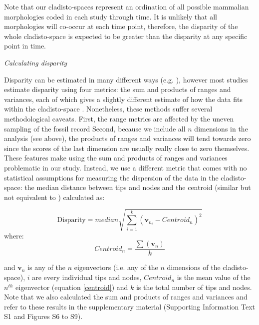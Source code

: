 \documentclass[12pt,letterpaper]{article}
\renewcommand{\subsection}[1]{%
\bigskip
\begin{center}
\begin{large}
\normalfont\itshape #1
\end{large}
\end{center}}
\begin{document}
Note that our cladisto-spaces represent an ordination of all possible mammalian morphologies coded in each study through time.
It is unlikely that all morphologies will co-occur at each time point, therefore, the disparity of the whole cladisto-space is expected to be greater than the disparity at any specific point in time.

\subsection{Calculating disparity}
Disparity can be estimated in many different ways (e.g. \cite{Wills1994,Ciampaglio2001}), however most studies estimate disparity using four metrics: the sum and products of ranges and variances, each of which gives a slightly different estimate of how the data fits within the cladisto-space \cite{Wills1994,brusatte50,Brusatte12092008,toljagictriassic-jurassic2013,ruta2013,bensonfaunal2014}.
Nonetheless, these methods suffer several methodological caveats.
First, the range metrics are affected by the uneven sampling of the fossil record \cite{Butler2012}
Second, because we include all $n$ dimensions in the analysis (see above), the products of ranges and variances will tend towards zero since the scores of the last dimension are usually really close to zero themselves. 
These features make using the sum and products of ranges and variances problematic in our study.
Instead, we use a different metric that comes with no statistical assumptions for measuring the dispersion of the data in the cladisto-space: the median distance between tips and nodes and the centroid (similar but not equivalent to \cite{Wills1994,kornextinction2013}) calculated as:

\begin{equation}
   \text{Disparity}=median{\displaystyle\sqrt{\sum_{i=1}^{k}{(\mathbf{v}_{n_{i}}-Centroid_{n})^2}}}
    \label{disparity}
\end{equation}
where:
\begin{equation}
    Centroid_{n}=\frac{\displaystyle\sum(\mathbf{v}_{n})}{k} 
    \label{centroid}
\end{equation}

\noindent
and $\mathbf{v}_{n}$ is any of the $n$ eigenvectors (i.e. any of the $n$ dimensions of the cladisto-space), $i$ are every individual tips and nodes, $Centroid_{n}$ is the mean value of the $n^{th}$ eigenvector (equation \ref{centroid}) and $k$ is the total number of tips and nodes.
Note that we also calculated the sum and products of ranges and variances and refer to these results in the supplementary material (Supporting Information Text S1 and Figures S6 to S9).
\end{document}
